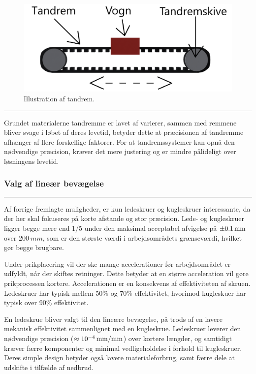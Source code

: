 \begin{figure}[H]
    \centering
\includegraphics[width=0.65\linewidth]{Sections/5 Konceptgenerering/Media/Illustration af tandrem 7.png}
    \caption{Illustration af tandrem.}
    \label{fig: Illustration af tandrem}
\end{figure} \plainbreak{-.5}

Grundet materialerne tandremme er lavet af varierer, sammen med remmene bliver svage i løbet af deres levetid, betyder dette at præcisionen af tandremme afhænger af flere forskellige faktorer. For at tandremssystemer kan opnå den nødvendige præcision, kræver det mere justering og er mindre pålideligt over løsningens levetid. \parencite{Casillo2025Belt-DrivenInc} \\


\subsubsection{Valg af lineær bevægelse}  \plainbreak{-0.5}
Af forrige fremlagte muligheder, er kun ledeskruer og kugleskruer interessante, da der her skal fokuseres på korte afstande og stor præcision. Lede- og kugleskruer ligger begge mere end 1/5 under den maksimal acceptabel afvigelse på \(\SI{\pm0,1}{mm}\) over \(\SI{200}{mm}\), som er den største værdi i arbejdsområdets grænseværdi, hvilket gør begge brugbare.

Under prikplacering vil der ske mange accelerationer før arbejdsområdet er udfyldt, når der skiftes retninger. Dette betyder at en større acceleration vil gøre prikprocessen kortere. Accelerationen er en konsekvens af effektiviteten af skruen. Ledeskruer har typisk mellem 50\% og 70\% effektivitet, hvorimod kugleskuer har typisk over 90\% effektivitet. \parencite{johoty.com2025BallBest}

En ledeskrue bliver valgt til den lineære bevægelse, på trods af en lavere mekanisk effektivitet sammenlignet med en kugleskrue. Ledeskruer leverer den nødvendige præcision ($\approx \SI{d-4}{mm/mm}$) over kortere længder, og samtidigt kræver færre komponenter og minimal vedligeholdelse i forhold til kugleskruer. Deres simple design betyder også lavere materialeforbrug, samt færre dele at udskifte i tilfælde af nedbrud. 
